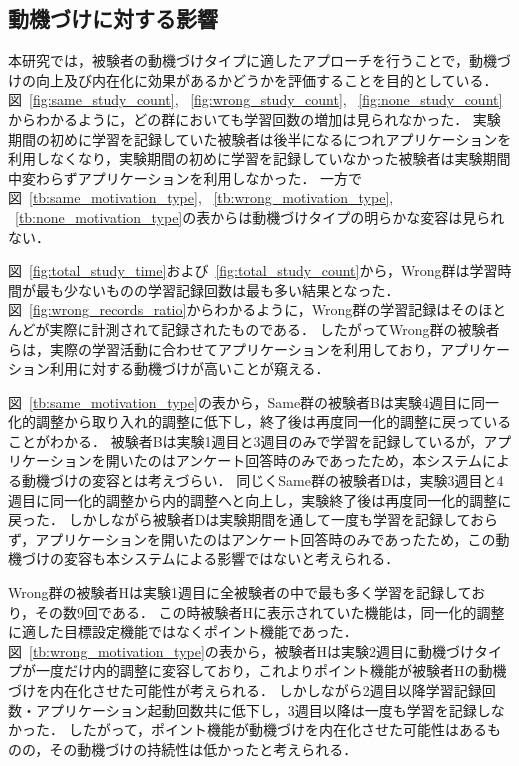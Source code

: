 \subsection{動機づけに対する影響}
本研究では，被験者の動機づけタイプに適したアプローチを行うことで，動機づけの向上及び内在化に効果があるかどうかを評価することを目的としている．
図~\ref{fig:same_study_count}, ~\ref{fig:wrong_study_count}, ~\ref{fig:none_study_count}からわかるように，どの群においても学習回数の増加は見られなかった．
実験期間の初めに学習を記録していた被験者は後半になるにつれアプリケーションを利用しなくなり，実験期間の初めに学習を記録していなかった被験者は実験期間中変わらずアプリケーションを利用しなかった．
一方で図~\ref{tb:same_motivation_type}, ~\ref{tb:wrong_motivation_type}, ~\ref{tb:none_motivation_type}の表からは動機づけタイプの明らかな変容は見られない．

図~\ref{fig:total_study_time}および~\ref{fig:total_study_count}から，Wrong群は学習時間が最も少ないものの学習記録回数は最も多い結果となった．
図~\ref{fig:wrong_records_ratio}からわかるように，Wrong群の学習記録はそのほとんどが実際に計測されて記録されたものである．
したがってWrong群の被験者らは，実際の学習活動に合わせてアプリケーションを利用しており，アプリケーション利用に対する動機づけが高いことが窺える．

図~\ref{tb:same_motivation_type}の表から，Same群の被験者Bは実験4週目に同一化的調整から取り入れ的調整に低下し，終了後は再度同一化的調整に戻っていることがわかる．
被験者Bは実験1週目と3週目のみで学習を記録しているが，アプリケーションを開いたのはアンケート回答時のみであったため，本システムによる動機づけの変容とは考えづらい．
同じくSame群の被験者Dは，実験3週目と4週目に同一化的調整から内的調整へと向上し，実験終了後は再度同一化的調整に戻った．
しかしながら被験者Dは実験期間を通して一度も学習を記録しておらず，アプリケーションを開いたのはアンケート回答時のみであったため，この動機づけの変容も本システムによる影響ではないと考えられる．

Wrong群の被験者Hは実験1週目に全被験者の中で最も多く学習を記録しており，その数9回である．
この時被験者Hに表示されていた機能は，同一化的調整に適した目標設定機能ではなくポイント機能であった．
図~\ref{tb:wrong_motivation_type}の表から，被験者Hは実験2週目に動機づけタイプが一度だけ内的調整に変容しており，これよりポイント機能が被験者Hの動機づけを内在化させた可能性が考えられる．
しかしながら2週目以降学習記録回数・アプリケーション起動回数共に低下し，3週目以降は一度も学習を記録しなかった．
したがって，ポイント機能が動機づけを内在化させた可能性はあるものの，その動機づけの持続性は低かったと考えられる．

